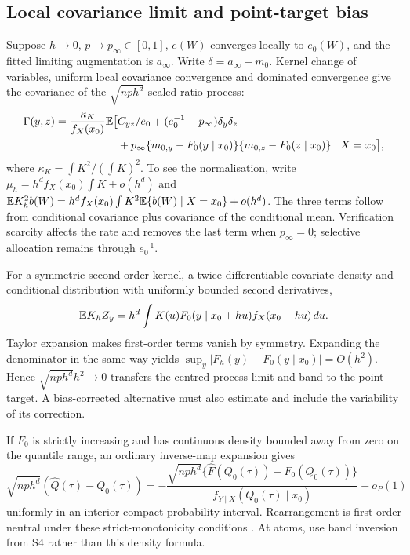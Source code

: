 \subsection{Local covariance limit and point-target bias}
Suppose $h\to0$, $p\to p_\infty\in[0,1]$, $e(W)$ converges locally to $e_0(W)$, and the fitted limiting augmentation is $a_\infty$. Write $\delta=a_\infty-m_0$. Kernel change of variables, uniform local covariance convergence and dominated convergence give the covariance of the $\sqrt{nph^d}$-scaled ratio process:
\begin{align}
 \Gamma(y,z)=\frac{\kappa_K}{f_X(x_0)}\mathbb E\big[&C_{yz}/e_0+(e_0^{-1}-p_\infty)\delta_y\delta_z\notag\\
 &+p_\infty\{m_{0,y}-F_0(y\mid x_0)\}\{m_{0,z}-F_0(z\mid x_0)\}\mid X=x_0\big],
\end{align}
where $\kappa_K=\int K^2/(\int K)^2$. To see the normalisation, write $\mu_h=h^df_X(x_0)\int K+o(h^d)$ and
$\mathbb E K_h^2b(W)=h^df_X(x_0)\int K^2\mathbb E\{b(W)\mid X=x_0\}+o(h^d)$.
The three terms follow from conditional covariance plus covariance of the conditional mean. Verification scarcity affects the rate and removes the last term when $p_\infty=0$; selective allocation remains through $e_0^{-1}$.

For a symmetric second-order kernel, a twice differentiable covariate density and conditional distribution with uniformly bounded second derivatives,
\[
 \mathbb E K_hZ_y=h^d\int K(u)F_0(y\mid x_0+hu)f_X(x_0+hu)\,du.
\]
Taylor expansion makes first-order terms vanish by symmetry. Expanding the denominator in the same way yields $\sup_y|F_h(y)-F_0(y\mid x_0)|=O(h^2)$. Hence $\sqrt{nph^d}h^2\to0$ transfers the centred process limit and band to the point target. A bias-corrected alternative must also estimate and include the variability of its correction.

If $F_0$ is strictly increasing and has continuous density bounded away from zero on the quantile range, an ordinary inverse-map expansion gives
\[
 \sqrt{nph^d}(\widehat Q(\tau)-Q_0(\tau))
 =-\frac{\sqrt{nph^d}\{\widehat F(Q_0(\tau))-F_0(Q_0(\tau))\}}
 {f_{Y\mid X}(Q_0(\tau)\mid x_0)}+o_P(1)
\]
uniformly in an interior compact probability interval. Rearrangement is first-order neutral under these strict-monotonicity conditions \citep{ChernozhukovEtAl2010}. At atoms, use band inversion from S4 rather than this density formula.

